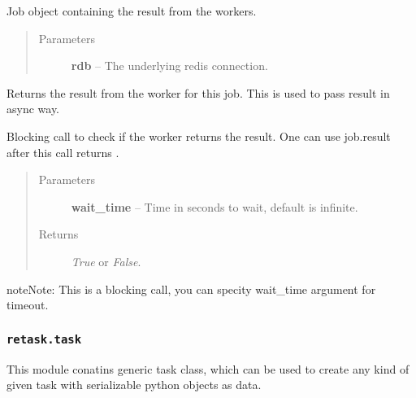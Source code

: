 \documentclass[letterpaper,10pt,english]{sphinxmanual}
\begin{document}
\begin{fulllineitems}
\label{retask.queue:retask.queue.Job}
Job object containing the result from the workers.
\begin{quote}\begin{description}
\item[{Parameters}] \leavevmode
\textbf{rdb} -- The underlying redis connection.

\end{description}\end{quote}

\begin{fulllineitems}
\label{retask.queue:retask.queue.Job.result}
Returns the result from the worker for this job. This is used to pass
result in async way.

\end{fulllineitems}


\begin{fulllineitems}
\label{retask.queue:retask.queue.Job.wait}
Blocking call to check if the worker returns the result. One can use
job.result after this call returns .
\begin{quote}\begin{description}
\item[{Parameters}] \leavevmode
\textbf{wait\_time} -- Time in seconds to wait, default is infinite.

\item[{Returns}] \leavevmode
\emph{True} or \emph{False}.

\end{description}\end{quote}

\begin{notice}{note}{Note:}
This is a blocking call, you can specity wait\_time argument for timeout.
\end{notice}

\end{fulllineitems}


\end{fulllineitems}



\subsubsection{\texttt{retask.task}}
\label{retask.task:retask-task}\label{retask.task::doc}
This module conatins generic task class, which can be used to create
any kind of given task with serializable python objects as data.
\end{document}
